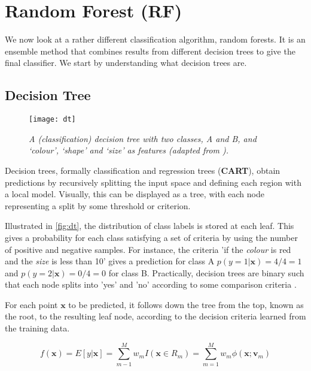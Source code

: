 \newpage
\section{Random Forest (RF)} \label{sec:tech-rf}

We now look at a rather different classification algorithm, random forests. It is an ensemble method that combines results from different decision trees to give the final classifier. We start by understanding what decision trees are.

\subsection{Decision Tree}
\begin{figure}[H]
  \centering
  \texttt{[image: dt]}
  \caption{\textit{A (classification) decision tree with two classes, A and B,  and `colour', `shape' and `size' as features (adapted from \protect{}).}}
  \label{fig:dt}
\end{figure}

Decision trees, formally classification and regression trees (\textbf{CART}), obtain predictions by recursively splitting the input space and defining each region with a local model. Visually, this can be displayed as a tree, with each node representing a split by some threshold or criterion. 

Illustrated in \autoref{fig:dt}, the distribution of class labels is stored at each leaf. This gives a probability for each class satisfying a set of criteria by using the number of positive and negative samples. For instance, the criteria 'if the \textit{colour} is red and the \textit{size} is less than 10' gives a prediction for class A $p(y=1|\mathbf{x}) = 4/4 = 1$ and $p(y=2|\mathbf{x}) = 0/4 = 0$ for class B. Practically, decision trees are binary such that each node splits into 'yes' and 'no' according to some comparison criteria \cite{mur-book}.

For each point $\mathbf{x}$ to be predicted, it follows down the tree from the top, known as the root, to the resulting leaf node, according to the decision criteria learned from the training data.

\begin{equation} \label{eq:dt}
  f(\mathbf{x}) = E[y|\mathbf{x}] = \sum_{m-1}^{M} w_m I(\mathbf{x} \in R_m)
                                  = \sum_{m=1}^{M} w_m \phi(\mathbf{x}; \mathbf{v}_m)
\end{equation}

